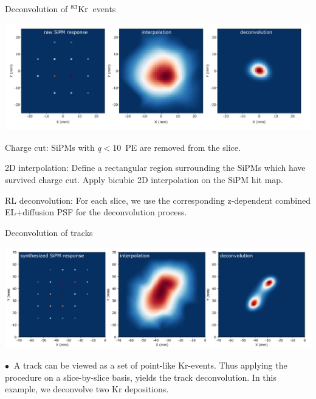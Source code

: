 \documentclass [aspectratio=169]{beamer}
\newcommand{\KR}{\ensuremath{{}^{83}{\rm Kr}}}
\begin{document}
\begin{frame}{Deconvolution of \KR\ events}

\includegraphics[scale=0.27]{psfint.png}

\begin{enumerate}
	
	{\color{uwopurple} \item Charge cut: SiPMs with $q < 10$~PE  are removed from the slice.} 
	{\color{uwopurple} \item 2D interpolation: Define a rectangular region surrounding the SiPMs which have survived charge cut. Apply bicubic 2D interpolation on the  SiPM hit map.}
	{\color{uwopurple} \item RL deconvolution: For each slice, we use the corresponding z-dependent combined EL+diffusion PSF for the deconvolution process. }
\end{enumerate}
\end{frame}

\begin{frame}{Deconvolution of tracks}

\includegraphics[scale=0.27]{decon2kr.png}

$\bullet~$ A track can be viewed as a set of point-like Kr-events. Thus applying the procedure on a slice-by-slice basis, yields the track deconvolution. In this example, we deconvolve two Kr depositions. 
\end{frame}
\end{document}
